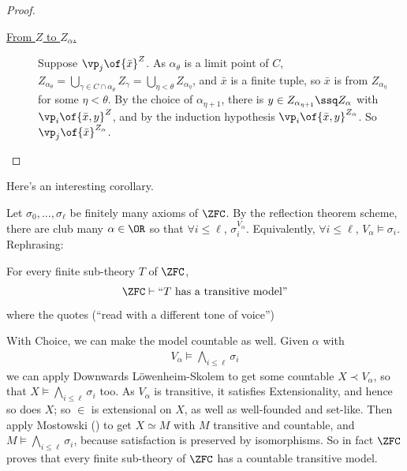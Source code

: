 \begin{proof}
\begin{description}
        \item[\underline{From $Z$ to $Z_{\alpha}$.}] Suppose $\vp_j\of{\bar{x}}^Z$. As $\alpha_{\theta}$ is a limit point of $C$, $Z_{\alpha_{\theta}} = \bigcup_{\gamma \in C \cap \alpha_{\theta}} Z_{\gamma} = \bigcup_{\eta < \theta} Z_{\alpha_{\eta}}$, and $\bar{x}$ is a finite tuple, so $\bar{x}$ is from $Z_{\alpha_{\eta}}$ for some $\eta < \theta$. By the choice of $\alpha_{\eta + 1}$, there is $y \in Z_{\alpha_{\eta + 1}} \ssq Z_{\alpha}$ with $\vp_i\of{\bar{x}, y}^Z$, and by the induction hypothesis $\vp_i\of{\bar{x}, y}^{Z_{\alpha}}$. So $\vp_j\of{\bar{x}}^{Z_{\alpha}}$.
    \end{description}
\end{proof}

Here's an interesting corollary.

Let $\sigma_0, \ldots, \sigma_{\ell}$ be finitely many axioms of $\ZFC$. By the reflection theorem scheme, there are club many $\alpha \in \OR$ so that $\forall  i \leq \ell$, $\sigma_i^{V_{\alpha}}$. Equivalently, $\forall i \leq \ell$, $V_{\alpha} \models \sigma_i$. Rephrasing:

\begin{boxcorollary}
    For every finite sub-theory $T$ of $\ZFC$,
    \begin{align*}
        \ZFC \vdash \text{``$T$ has a transitive model''}
    \end{align*}
    where the quotes (``read with a different tone of voice'')
\end{boxcorollary}

With Choice, we can make the model countable as well. Given $\alpha$ with
\begin{align*}
    V_{\alpha} \models \bigwedge_{i \leq \ell} \sigma_i
\end{align*}
we can apply Downwards Löwenheim-Skolem to get some countable $X \prec V_{\alpha}$, so that $X \models \bigwedge_{i \leq \ell} \sigma_i$ too. As $V_{\alpha}$ is transitive, it satisfies Extensionality, and hence so does $X$; so $\in$ is extensional on $X$, as well as well-founded and set-like. Then apply Mostowski () to get $X \simeq M$ with $M$ transitive and countable, and $M \models \bigwedge_{i \leq \ell} \sigma_i$, because satisfaction is preserved by isomorphisms. So in fact $\ZFC$ proves that every finite sub-theory of $\ZFC$ has a countable transitive model.
